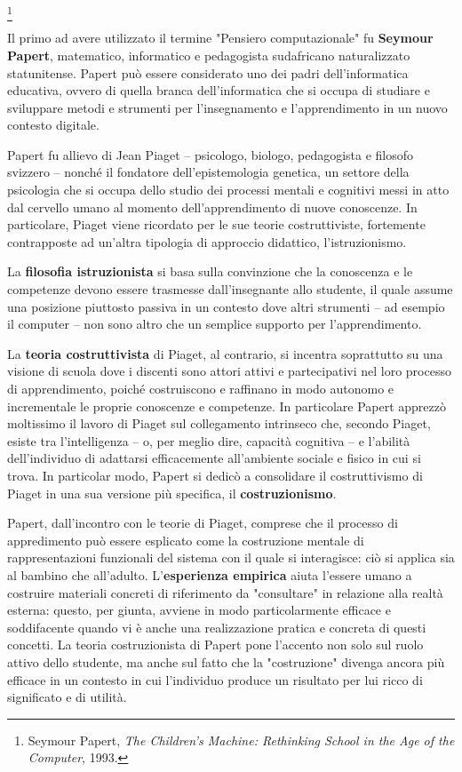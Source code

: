   \footnote[1]{Seymour Papert, \textit{The Children's Machine: Rethinking School in the Age of the Computer}, 1993.}

Il primo ad avere utilizzato il termine "Pensiero computazionale" fu \textbf{Seymour Papert}, matematico, informatico e pedagogista sudafricano naturalizzato statunitense. 
Papert può essere considerato uno dei padri dell'informatica educativa, ovvero di quella branca dell'informatica che si occupa di studiare e sviluppare metodi e strumenti per l'insegnamento e l'apprendimento in un nuovo contesto digitale.

Papert fu allievo di Jean Piaget – psicologo, biologo, pedagogista e filosofo svizzero – nonché il fondatore dell'epistemologia genetica, un settore della psicologia che
si occupa dello studio dei processi mentali e cognitivi messi in atto dal cervello umano al momento dell'apprendimento di nuove conoscenze. In particolare, Piaget viene ricordato per le sue teorie
costruttiviste, fortemente contrapposte ad un'altra tipologia di approccio didattico, l'istruzionismo. 

La \textbf{filosofia istruzionista} si basa sulla convinzione che la conoscenza e le competenze devono essere trasmesse dall'insegnante allo studente, 
il quale assume una posizione piuttosto passiva in un contesto dove altri strumenti
– ad esempio il computer – non sono altro che un semplice supporto per l'apprendimento. 

La \textbf{teoria costruttivista} di Piaget, al contrario, si incentra soprattutto su una visione di scuola dove 
i discenti sono attori attivi e partecipativi nel loro processo di apprendimento, poiché costruiscono e raffinano in modo autonomo e incrementale le proprie conoscenze e competenze.
In particolare Papert apprezzò moltissimo il lavoro di Piaget sul collegamento intrinseco che, secondo Piaget, esiste tra l'intelligenza – o, per meglio dire, capacità cognitiva – e l'abilità dell'individuo di adattarsi efficacemente all'ambiente sociale e fisico in cui 
si trova. In particolar modo, Papert si dedicò a consolidare il costruttivismo di Piaget in una sua versione più specifica, il \textbf{costruzionismo}. 

Papert, dall'incontro con le teorie di Piaget, comprese che il processo di appredimento può essere esplicato come la costruzione mentale di rappresentazioni funzionali del sistema con
il quale si interagisce: ciò si applica sia al bambino che all'adulto.
L'\textbf{esperienza empirica} aiuta l'essere umano a costruire materiali concreti di riferimento da "consultare" in relazione alla realtà esterna: questo, per giunta, avviene in modo particolarmente efficace 
e soddifacente quando vi è anche una realizzazione pratica e concreta di questi concetti. 
La teoria costruzionista di Papert pone l'accento non solo sul ruolo attivo dello studente, ma anche sul fatto che la "costruzione" divenga ancora più efficace in un contesto in cui l'individuo produce un risultato per lui 
ricco di significato e di utilità.

